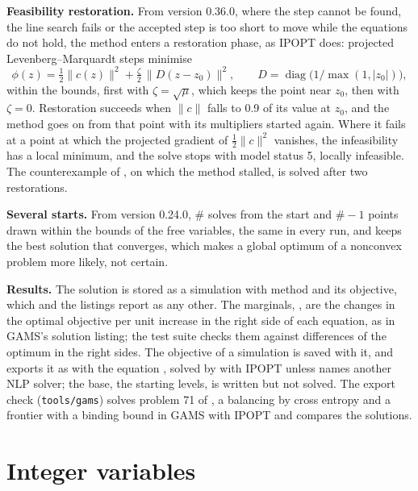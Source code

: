 \textbf{Feasibility restoration.} From version 0.36.0, where the step cannot
be found, the line search fails or the accepted step is too short to move
while the equations do not hold, the method enters a restoration phase, as
IPOPT does: projected Levenberg--Marquardt steps minimise
\begin{equation*}
\phi(z) = \tfrac12 \lVert c(z) \rVert^2 + \tfrac{\zeta}{2}\,\lVert D (z - z_0) \rVert^2,
\qquad D = \operatorname{diag}\bigl(1/\max(1, |z_0|)\bigr),
\end{equation*}
within the bounds, first with $\zeta = \sqrt{\mu}$, which keeps the point
near $z_0$, then with $\zeta = 0$. Restoration succeeds when $\lVert c \rVert$
falls to 0.9 of its value at $z_0$, and the method goes on from that point
with its multipliers started again. Where it fails at a point at which the
projected gradient of $\tfrac12 \lVert c \rVert^2$ vanishes, the
infeasibility has a local minimum, and the solve stops with model status 5,
locally infeasible. The counterexample of \citet{wachter2000}, on which the
method stalled, is solved after two restorations.

\textbf{Several starts.} From version 0.24.0, \#\cmd{)} solves
from the start and $\# - 1$ points drawn within the bounds of the free
variables, the same in every run, and keeps the best solution that
converges, which makes a global optimum of a nonconvex problem more likely,
not certain.

\textbf{Results.} The solution is stored as a simulation with method
 and its objective, which  and the listings
report as any other. The marginals, , are the changes in the
optimal objective per unit increase in the right side of each equation, as in
GAMS's solution listing; the test suite checks them against differences of
the optimum in the right sides. The objective of a simulation is saved with
it, and  exports it as  with the equation
, solved by  with IPOPT unless
 names another NLP solver; the base, the starting levels, is
written but not solved. The export check (\texttt{tools/gams}) solves
problem 71 of \citet{hock1981}, a balancing by cross entropy and a frontier
with a binding bound in GAMS with IPOPT and compares the solutions.

\section{Integer variables}\label{sec:integer}


